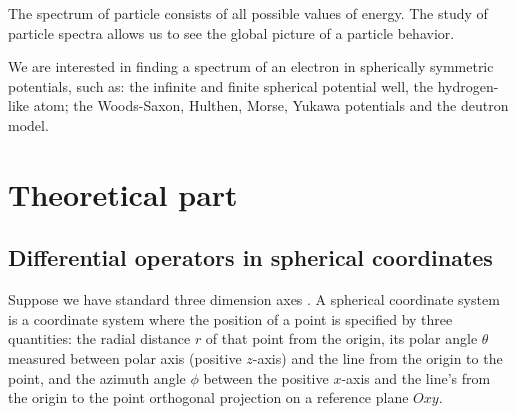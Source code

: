 \documentclass[a4paper, 12pt]{article}
\begin{document}
The spectrum of particle consists of all possible values of energy. The study of particle spectra allows us to see the global picture of a particle behavior. 


We are interested in finding a spectrum of an electron in spherically symmetric potentials, such as: the infinite and finite spherical potential well, the hydrogen-like atom; the Woods-Saxon, Hulthen, Morse, Yukawa potentials and the deutron model.


\section{Theoretical part}
\subsection{Differential operators in spherical coordinates}\label{dif_op_3d}


Suppose we have standard three dimension axes . A spherical coordinate system is a coordinate system where the position of a point is specified by three quantities: the radial distance $r$ of that point from the origin, its polar angle $\theta$ measured between polar axis (positive $z$-axis) and the line from the origin to the point, and the azimuth angle $\phi$ between the positive $x$-axis  and the line's from the origin to the point orthogonal projection on a reference plane $Oxy$.
\end{document}
